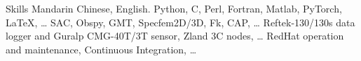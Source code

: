 
\begin{rubric}{Skills}
\entry*[Languages]
	Mandarin Chinese, English.
	Python, C, Perl, Fortran, Matlab, PyTorch, \LaTeX, \ldots
{}
	SAC, Obspy, GMT, Specfem2D/3D, Fk, CAP, \ldots
\entry*[Instruments]
     Reftek-130/130s data logger and Guralp CMG-40T/3T sensor, Zland 3C nodes, \ldots
\entry*[Misc.]
	RedHat operation and maintenance, Continuous Integration, \ldots
\end{rubric}
